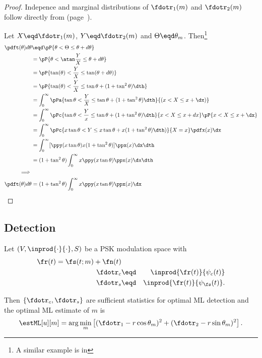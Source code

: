 \begin{proof}

Indepence and marginal distributions of $\fdotr_1(m)$ and $\fdotr_2(m)$
follow directly from
 (page~\pageref{thm:ms_stats}).

Let $X\eqd\fdotr_1(m)$, $Y\eqd\fdotr_2(m)$ and $\Theta\eqd\theta_m$.
Then\footnote{A similar example is in }
\begin{align*}
   \pdft(\theta)d\theta
     &\eqd \pP{\theta < \Theta \le \theta + d\theta}
   \\&=    \pP{\theta < \atan\frac{Y}{X} \le \theta + d\theta}
   \\&=    \pP{\tan(\theta) < \frac{Y}{X} \le \tan(\theta + d\theta)}
   \\&=    \pP{\tan(\theta) < \frac{Y}{X} \le \tan\theta + (1+\tan^2\theta)\dth}
   \\&=    \int_0^\infty \pPa{\tan\theta < \frac{Y}{X} \le \tan\theta + (1+\tan^2\theta)\dth}{(x<X\le x+\dx)}
   \\&=    \int_0^\infty \pPc{\tan\theta < \frac{Y}{x} \le \tan\theta + (1+\tan^2\theta)\dth}{x<X\le x+dx}\pP{x<X\le x+\dx}
   \\&=    \int_0^\infty \pPc{x\tan\theta < Y \le x\tan\theta + x(1+\tan^2\theta)\dth)}{X=x} \pdfx(x)\dx
   \\&=    \int_0^\infty [\ppy(x\tan\theta)x(1+\tan^2\theta)] \ppx(x) \dx \dth
   \\&=    (1+\tan^2\theta) \int_0^\infty x\ppy(x\tan\theta) \ppx(x) \dx \dth
\\\implies\\
   \pdft(\theta)d\theta
     &= (1+\tan^2\theta) \int_0^\infty x\ppy(x\tan\theta) \ppx(x) \dx
\end{align*}
\attention
\end{proof}

\subsection{Detection}
\begin{theorem}
Let $(V,\inprod{\cdot}{\cdot},S)$ be a PSK modulation space with
\begin{align*}
   \fr(t) = \fs(t;m)+\fn(t) \\
   \fdotr_c &\eqd& \inprod{\fr(t)}{\psi_c(t)} \\
   \fdotr_s &\eqd& \inprod{\fr(t)}{\psi_\fs(t)}.
\end{align*}

Then $\{\fdotr_c,\fdotr_s\}$ are sufficient statistics for
optimal ML detection and the optimal ML estimate of $m$ is
\[ \estML[u][m] = \arg\min_m
      \left[
         (\fdotr_1-r\cos\theta_m)^2  +
         (\fdotr_2-r\sin\theta_m)^2
      \right].
\]
\end{theorem}

